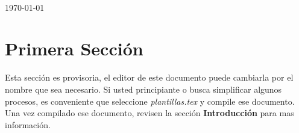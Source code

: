 \documentclass{article}
\begin{document}
\begin{titlepage}
\begin{minipage}{0.4\textwidth}
\begin{flushleft}
\end{flushleft}

\end{minipage}\\[1cm]



{\large \today}\\[2cm] %

\vfill 

\end{titlepage}

\pagebreak
\tableofcontents
\pagebreak
\section{Primera Sección}
Esta sección es provisoria, el editor de este documento puede cambiarla por el nombre que sea necesario. Si usted principiante o busca simplificar algunos procesos, es conveniente que seleccione \emph{plantillas.tex} y compile ese documento. Una vez compilado ese documento, revisen la sección \textbf{Introducción} para mas información.



\pagebreak

\pagebreak


\printbibliography[title={Bibliografía},heading=bibintoc]
\end{document}
